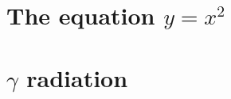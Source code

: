 \documentclass{book}
\begin{document}


\frontmatter

\tableofcontents
\listoftables
\listoffigures

\mainmatter



\section{The equation \texorpdfstring{$y=x^2$}{y=x\texttwosuperior}}
\section{\texorpdfstring{$\gamma$}{\textgamma} radiation}

\backmatter

\nocite{*}



\end{document}
